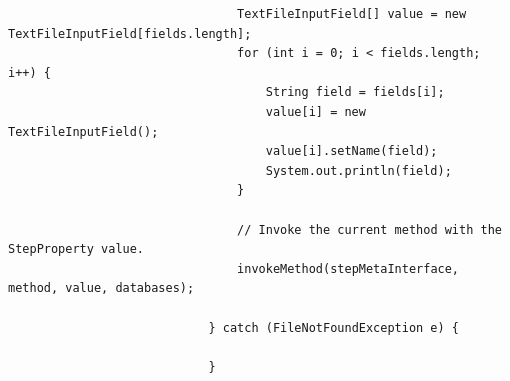 \documentclass[
  11pt,
]{krantz}
\begin{document}
\begin{verbatim}
                                TextFileInputField[] value = new TextFileInputField[fields.length];
                                for (int i = 0; i < fields.length; i++) {
                                    String field = fields[i];
                                    value[i] = new TextFileInputField();
                                    value[i].setName(field);
                                    System.out.println(field);
                                }

                                // Invoke the current method with the StepProperty value.
                                invokeMethod(stepMetaInterface, method, value, databases);

                            } catch (FileNotFoundException e) {

                            }
\end{verbatim}

  

\printindex
\end{document}
